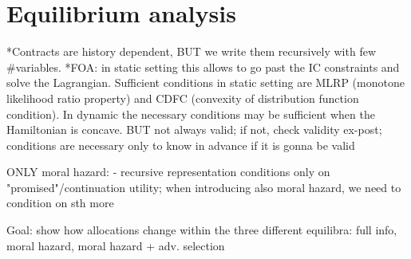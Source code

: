 \section{Equilibrium analysis}

*Contracts are history dependent, BUT we write them recursively with few \#variables.
*FOA: in static setting this allows to go past the IC constraints and solve the Lagrangian. Sufficient conditions in static setting are MLRP (monotone likelihood ratio property) and CDFC (convexity of distribution function condition). In dynamic the necessary conditions may be sufficient when the Hamiltonian is concave.
    BUT not always valid; if not, check validity ex-post; conditions are necessary only to know in advance if it is gonna be valid




ONLY moral hazard:
- recursive representation conditions only on "promised"/continuation utility; when introducing also moral hazard, we need to condition on sth more






Goal: show how allocations change within the three different equilibra: full info, moral hazard, moral hazard + adv. selection 